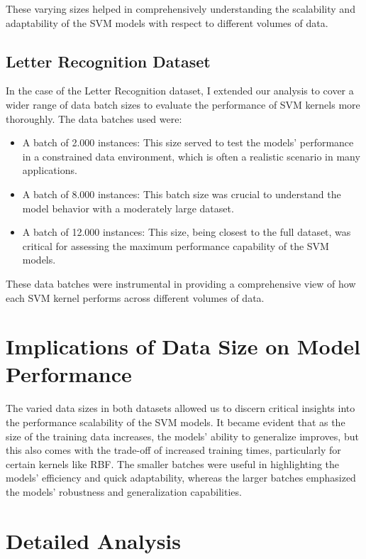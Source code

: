 \documentclass[conference]{IEEEtran}
\begin{document}
These varying sizes helped in comprehensively understanding the scalability and adaptability of the SVM models with respect to different volumes of data.

\subsection{Letter Recognition Dataset}

In the case of the Letter Recognition dataset, I extended our analysis to cover a wider range of data batch sizes to evaluate the performance of SVM kernels more thoroughly. The data batches used were:

\begin{itemize}
\item A batch of 2.000 instances: This size served to test the models' performance in a constrained data environment, which is often a realistic scenario in many applications.
\item A batch of 8.000 instances: This batch size was crucial to understand the model behavior with a moderately large dataset.
\item A batch of 12.000 instances: This size, being closest to the full dataset, was critical for assessing the maximum performance capability of the SVM models.
\end{itemize}

These data batches were instrumental in providing a comprehensive view of how each SVM kernel performs across different volumes of data.

\section{Implications of Data Size on Model Performance}

The varied data sizes in both datasets allowed us to discern critical insights into the performance scalability of the SVM models. It became evident that as the size of the training data increases, the models' ability to generalize improves, but this also comes with the trade-off of increased training times, particularly for certain kernels like RBF. The smaller batches were useful in highlighting the models' efficiency and quick adaptability, whereas the larger batches emphasized the models' robustness and generalization capabilities.

\section{Detailed Analysis}
\end{document}
